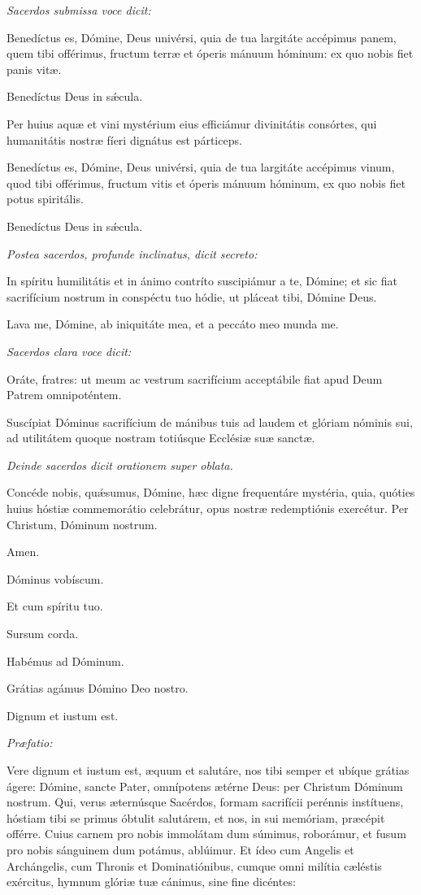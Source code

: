 \textit{Sacerdos submissa voce dicit:}

Benedíctus es, Dómine, Deus univérsi, quia de tua largitáte accépimus panem, quem tibi offérimus, fructum terræ et óperis mánuum hóminum: ex quo nobis fiet panis vitæ.

\Rbardot{} Benedíctus Deus in sǽcula.

Per huius aquæ et vini mystérium eius efficiámur divinitátis consórtes, qui humanitátis nostræ fíeri dignátus est párticeps.

Benedíctus es, Dómine, Deus univérsi, quia de tua largitáte accépimus vinum, quod tibi offérimus, fructum vitis et óperis mánuum hóminum, ex quo nobis fiet potus spiritális.

\Rbardot{} Benedíctus Deus in sǽcula.

\textit{Postea sacerdos, profunde inclinatus, dicit secreto:}

In spíritu humilitátis et in ánimo contríto suscipiámur a te, Dómine; et sic fiat sacrifícium nostrum in conspéctu tuo hódie, ut pláceat tibi, Dómine Deus.

Lava me, Dómine, ab iniquitáte mea, et a peccáto meo munda me.

\textit{Sacerdos clara voce dicit:}

Oráte, fratres: ut meum ac vestrum sacrifícium acceptábile fiat apud Deum Patrem omnipoténtem.

\Rbardot{} Suscípiat Dóminus sacrifícium de mánibus tuis ad laudem et glóriam nóminis sui, ad utilitátem quoque nostram totiúsque Ecclésiæ suæ sanctæ.

\textit{Deinde sacerdos dicit orationem super oblata.}

Concéde nobis, quǽsumus, Dómine, hæc digne frequentáre mystéria, quia, quóties huius hóstiæ commemorátio celebrátur, opus nostræ redemptiónis exercétur. Per Christum, Dóminum nostrum.

\Rbardot{} Amen.

\Vbardot{} Dóminus vobíscum.

\Rbardot{} Et cum spíritu tuo.

\Vbardot{} Sursum corda.

\Rbardot{} Habémus ad Dóminum.

\Vbardot{} Grátias agámus Dómino Deo nostro.

\Rbardot{} Dignum et iustum est.

\textit{Præfatio:}

Vere dignum et iustum est, æquum et salutáre, nos tibi semper et ubíque grátias ágere: Dómine, sancte Pater, omnípotens ætérne Deus: per Christum Dóminum nostrum. Qui, verus æternúsque Sacérdos, formam sacrifícii perénnis instítuens, hóstiam tibi se primus óbtulit salutárem, et nos, in sui memóriam, præcépit offérre. Cuius carnem pro nobis immolátam dum súmimus, roborámur, et fusum pro nobis sánguinem dum potámus, ablúimur. Et ídeo cum Angelis et Archángelis, cum Thronis et Dominatiónibus, cumque omni milítia cæléstis exércitus, hymnum glóriæ tuæ cánimus, sine fine dicéntes:
